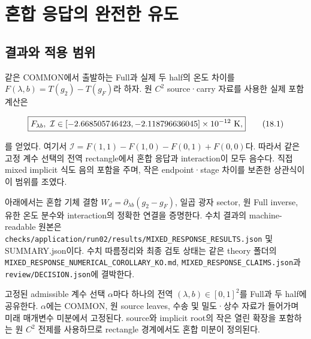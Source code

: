 \clearpage
\section{혼합 응답의 완전한 유도}
\hypertarget{uxacb0uxacfcuxc640-uxc801uxc6a9-uxbc94uxc704}{%
\subsection{결과와 적용
범위}\label{uxacb0uxacfcuxc640-uxc801uxc6a9-uxbc94uxc704}}

같은 COMMON에서 출발하는 Full과 실제 두 half의 온도 차이를
\(F(\lambda,b)=T(g_2)-T(g_F)\)라 하자. 원 \(C^2\) source·carry 자료를
사용한 실제 포함 계산은

\[
\boxed{
F_{\lambda b},\ \mathcal I
\in[-2.668505746423,-2.118796636045]\times10^{-12}\ {\rm K},
}
\tag{18.1}
\]

를 얻었다. 여기서 \(\mathcal I=F(1,1)-F(1,0)-F(0,1)+F(0,0)\)다. 따라서
같은 고정 계수 선택의 전역 rectangle에서 혼합 응답과 interaction이 모두
음수다. 직접 mixed implicit 식도 음의 포함을 주며, 작은 endpoint·stage
차이를 보존한 상관식이 이 범위를 조였다.

아래에서는 혼합 기체 결함 \(W_d=\partial_{\lambda b}(g_2-g_F)\), 일곱
광자 sector, 원 Full inverse, 유한 온도 분수와 interaction의 정확한
연결을 증명한다. 수치 결과의 machine-readable 원본은
\nolinkurl{checks/application/run02/results/MIXED_RESPONSE_RESULTS.json} 및
SUMMARY.json이다. 수치 따름정리와 최종 검토 상태는 같은 theory 폴더의
\nolinkurl{MIXED_RESPONSE_NUMERICAL_COROLLARY_KO.md},
\nolinkurl{MIXED_RESPONSE_CLAIMS.json}과 \nolinkurl{review/DECISION.json}에 결박한다.

고정된 admissible 계수 선택 \(\alpha\)마다 하나의 전역
\((\lambda,b)\in[0,1]^2\)를 Full과 두 half에 공유한다. \(\alpha\)에는
COMMON, 원 source leaves, 수송 및 밀도·상수 자료가 들어가며 미래
매개변수 미분에서 고정된다. source와 implicit root의 작은 열린 확장을
포함하는 원 \(C^2\) 전제를 사용하므로 rectangle 경계에서도 혼합 미분이
정의된다.

